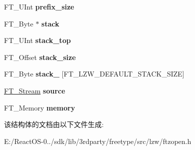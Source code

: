 \begin{DoxyCompactItemize}
F\+T\+\_\+\+U\+Int {\bfseries prefix\+\_\+size}
\item 
\mbox{\label{struct_f_t___lzw_state_rec___a92f8335f0d3e2c5597f6073fe424f7b0}} 
F\+T\+\_\+\+Byte $\ast$ {\bfseries stack}
\item 
\mbox{\label{struct_f_t___lzw_state_rec___ab4af1149c63c4fa9b8d6933de7ab9939}} 
F\+T\+\_\+\+U\+Int {\bfseries stack\+\_\+top}
\item 
\mbox{\label{struct_f_t___lzw_state_rec___ac29da78e15ef67a74db3cd4dd2d7966e}} 
F\+T\+\_\+\+Offset {\bfseries stack\+\_\+size}
\item 
\mbox{\label{struct_f_t___lzw_state_rec___a93386e93f830ebf6af882766d1e10f51}} 
F\+T\+\_\+\+Byte {\bfseries stack\+\_} \mbox{[}F\+T\+\_\+\+L\+Z\+W\+\_\+\+D\+E\+F\+A\+U\+L\+T\+\_\+\+S\+T\+A\+C\+K\+\_\+\+S\+I\+ZE\mbox{]}
\item 
\mbox{\label{struct_f_t___lzw_state_rec___a2d53aa0995ba61d5da515be01ed9971f}} 
\hyperlink{struct_f_t___stream_rec__}{F\+T\+\_\+\+Stream} {\bfseries source}
\item 
\mbox{\label{struct_f_t___lzw_state_rec___a17127536cf5cc510053e6feaac407f13}} 
F\+T\+\_\+\+Memory {\bfseries memory}
\end{DoxyCompactItemize}


该结构体的文档由以下文件生成\+:\begin{DoxyCompactItemize}
\item 
E\+:/\+React\+O\+S-\/0../sdk/lib/3rdparty/freetype/src/lzw/ftzopen.\+h\end{DoxyCompactItemize}
